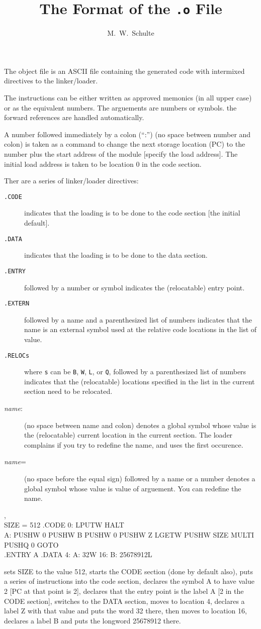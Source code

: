 \documentclass {article}
\author {M.~W.~Schulte}
\title {The Format of the {\tt .o} File}
\begin{document}
\maketitle

The object file is an ASCII file containing  the generated code with 
intermixed directives to the linker/loader.

The instructions can be either written as approved memonics (in all upper
case) or as the equivalent numbers.  The arguements are numbers or symbols.
the forward references are handled automatically.

A number followed immediately by a colon (``:'') 
(no space between number and colon) is taken as a command 
to change the next storage location (PC)  to the number 
plus the start address of the module [specify the load address].  
The initial load address is taken to be location 0 in the code section. 

Ther are a series of linker/loader directives:\begin {description}
\item [{\tt .CODE}] indicates that the loading is to be done to the 
code section [the initial default].  
\item [{\tt .DATA}] indicates that 
the loading is to be done to the data section.
\item [{\tt .ENTRY}] followed by a number or symbol indicates the 
(relocatable) entry point.
\item [{\tt .EXTERN}] followed by a name and a parenthesized
list of numbers indicates that the name is an external symbol used at the
relative code locations in the list of value.
\item [{\tt .RELOCs}] where {\tt s} can be {\tt B}, {\tt W}, {\tt L}, or 
{\tt Q}, followed by a parenthesized list of numbers indicates
that the (relocatable) locations specified in the list 
in the current section need to be relocated.
\item [{\it name}:] (no space between name and colon) denotes a global symbol 
whose value is the (relocatable) current location in the current section.
The loader complains if you try to redefine the name, and uses the first 
occurence.
\item [{\it name}=] (no space before the equal sign)
followed by a name or a number 
denotes a global symbol whose value is value of arguement.
You can redefine the name.
\end {description}
\pagebreak

\zB,\\
SIZE = 512 .CODE 0: LPUTW HALT\\ 
A: PUSHW 0 PUSHW B PUSHW 0 PUSHW Z LGETW PUSHW SIZE MULTI \\
PUSHQ 0 GOTO\\
.ENTRY A .DATA 4: A: 32W 16: B: 25678912L

sets SIZE to the value 512, starts the CODE section (done by default also),
puts a series of instructions into the code section, declares the symbol A 
to have value 2 [PC at that point is 2], declares that the entry point is 
the label A [2 in the CODE section], switches to the DATA section, moves to 
location 4, declares a label Z with that value and puts the word 32 there, 
then moves to location 16, declares a label B and 
puts the longword 25678912 there.
\end{document}
